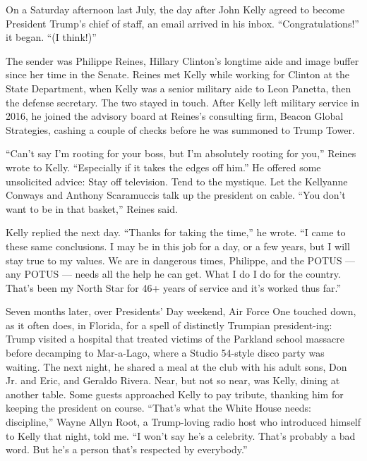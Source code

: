On a Saturday afternoon last July, the day after John Kelly agreed to
become President Trump's chief of staff, an email arrived in his inbox.
``Congratulations!'' it began. ``(I think!)''

The sender was Philippe Reines, Hillary Clinton's longtime aide and
image buffer since her time in the Senate. Reines met Kelly while
working for Clinton at the State Department, when Kelly was a senior
military aide to Leon Panetta, then the defense secretary. The two
stayed in touch. After Kelly left military service in 2016, he joined
the advisory board at Reines's consulting firm, Beacon Global
Strategies, cashing a couple of checks before he was summoned to Trump
Tower.

``Can't say I'm rooting for your boss, but I'm absolutely rooting for
you,'' Reines wrote to Kelly. ``Especially if it takes the edges off
him.'' He offered some unsolicited advice: Stay off television. Tend to
the mystique. Let the Kellyanne Conways and Anthony Scaramuccis talk up
the president on cable. ``You don't want to be in that basket,'' Reines
said.

Kelly replied the next day. ``Thanks for taking the time,'' he wrote.
``I came to these same conclusions. I may be in this job for a day, or a
few years, but I will stay true to my values. We are in dangerous times,
Philippe, and the POTUS --- any POTUS --- needs all the help he can get.
What I do I do for the country. That's been my North Star for 46+ years
of service and it's worked thus far.''

Seven months later, over Presidents' Day weekend, Air Force One touched
down, as it often does, in Florida, for a spell of distinctly Trumpian
president-ing: Trump visited a hospital that treated victims of the
Parkland school massacre before decamping to Mar-a-Lago, where a Studio
54-style disco party was waiting. The next night, he shared a meal at
the club with his adult sons, Don Jr. and Eric, and Geraldo Rivera.
Near, but not so near, was Kelly, dining at another table. Some guests
approached Kelly to pay tribute, thanking him for keeping the president
on course. ``That's what the White House needs: discipline,'' Wayne
Allyn Root, a Trump-loving radio host who introduced himself to Kelly
that night, told me. ``I won't say he's a celebrity. That's probably a
bad word. But he's a person that's respected by everybody.''

